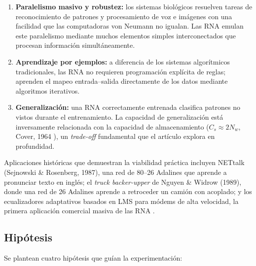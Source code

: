 \documentclass[11pt,a4paper]{article}
\begin{document}
\begin{enumerate}[label=\textbf{(\roman*)},leftmargin=*]
    \item \textbf{Paralelismo masivo y robustez:} los sistemas biológicos resuelven tareas de
    reconocimiento de patrones y procesamiento de voz e imágenes con una facilidad que las
    computadoras von Neumann no igualan. Las RNA emulan este paralelismo mediante muchos elementos
    simples interconectados que procesan información simultáneamente.
    \item \textbf{Aprendizaje por ejemplos:} a diferencia de los sistemas algorítmicos
    tradicionales, las RNA no requieren programación explícita de reglas; aprenden el mapeo
    entrada--salida directamente de los datos mediante algoritmos iterativos.
    \item \textbf{Generalización:} una RNA correctamente entrenada clasifica patrones no vistos
    durante el entrenamiento. La capacidad de generalización está inversamente relacionada con la
    capacidad de almacenamiento ($C_s \approx 2N_w$, Cover, 1964 \cite{cover1965}), un
    \textit{trade-off} fundamental que el artículo explora en profundidad.
\end{enumerate}

Aplicaciones históricas que demuestran la viabilidad práctica incluyen NETtalk (Sejnowski \&
Rosenberg, 1987), una red de 80--26 Adalines que aprende a pronunciar texto en inglés; el
\textit{truck backer-upper} de Nguyen \& Widrow (1989), donde una red de 26 Adalines aprende a
retroceder un camión con acoplado; y los ecualizadores adaptativos basados en LMS para módems
de alta velocidad, la primera aplicación comercial masiva de las RNA \cite{widrow1990}.

\subsection{Hipótesis}

Se plantean cuatro hipótesis que guían la experimentación:
\end{document}

